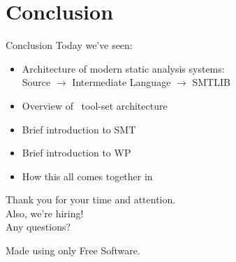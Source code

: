 \documentclass{beamer}
\begin{document}
\section{Conclusion}
\begin{frame}{Conclusion}
  Today we've seen:
  \begin{itemize}
  \item Architecture of modern static analysis systems:\\
    Source $\rightarrow$ Intermediate Language $\rightarrow$ SMTLIB
  \item Overview of \spark\ tool-set architecture
  \item Brief introduction to SMT
  \item Brief introduction to WP
  \item How this all comes together in 
  \end{itemize}
  \pause
  \begin{center}
    Thank you for your time and attention.\\
    Also, we're hiring!\\
    Any questions?\\
  \end{center}
  \begin{center}
    \scriptsize Made using only Free Software.
  \end{center}
\end{frame}
\end{document}
